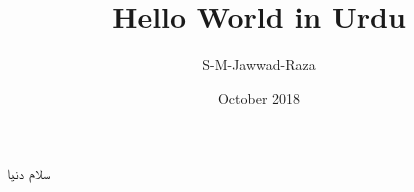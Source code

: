 \documentclass{article}
\title{Hello World in Urdu}
\author{S-M-Jawwad-Raza }
\date{October 2018}
\begin{document}
\maketitle

\centering \texturdu{سلام دنیا}
\end{document}
